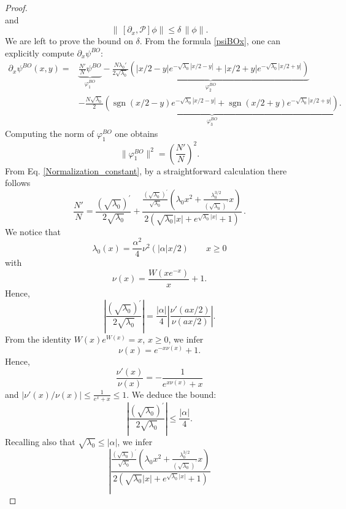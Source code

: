 \documentclass[10pt,a4paper]{amsart}
\newcommand{\NN}{N}
\newcommand{\PP}{\mathcal P}
\DeclareMathOperator{\sgn}{sgn}
\begin{document}
\begin{proof}
\[    \]
    and   
    \[
    \|\,[\partial_x, \PP]\phi\|  
     \leq \delta\, \|\phi\|. 
    \]   
We are left to prove the bound on $\delta$.
    From the formula \eqref{psiBOx}, one can explicitly compute $\partial_x\psi^{BO}$:
\[
\begin{aligned}
\partial_x \psi^{BO}(x,y) =&
\underbrace{\frac{\NN'}{\NN} \psi^{BO}}_{\varphi^{BO}_1}
-
\underbrace{\frac{{\NN}\lambda_0'}{2\sqrt{\lambda_0}}  
\left(|x/2-y|e^{-\sqrt{\lambda_0}|x/2-y|} +|x/2+y|e^{-\sqrt{\lambda_0}|x/2+y|}\right)}_{\varphi^{BO}_2} 
\\
&-\underbrace{\frac{{\NN} \sqrt{\lambda_0}}{2} 
\left(\sgn(x/2-y)e^{-\sqrt{\lambda_0}|x/2-y|} + \sgn(x/2+y)e^{-\sqrt{\lambda_0}|x/2+y|}\right)}_{\varphi^{BO}_3}. 
\end{aligned}
\]
Computing the norm of $\varphi^{BO}_1$ one obtains
\[
\|\varphi^{BO}_1\|^{2} =\left( \frac{\NN'}{\NN}\right)^2.
\]
From Eq. \eqref{Normalization_constant}, by a straightforward calculation there follows 
    \begin{equation*}
            \frac{\NN'}{\NN} = \frac{(\sqrt{\lambda_0})^{\prime}}{2\sqrt{\lambda_0}} + \frac{\frac{(\sqrt{\lambda_0})^{\prime}}{\sqrt{\lambda_0}} \left(\lambda_0 x^2 + \frac{\lambda_0^{3/2}}{(\sqrt{\lambda_0})^{\prime}}x\right)}{2 \left(  \sqrt{\lambda_0}|x|+e^{\sqrt{\lambda_0}|x|}+1\right)} \, .
    \end{equation*}
We notice that 
\[
\lambda_0(x) = \frac{\alpha^2}{4} \nu^2(|\alpha| x/ 2) \qquad x\geq 0
\]
with 
\[
\nu(x) = \frac{W(xe^{-x})}{x}+1.
\]
Hence, 
\begin{equation*}%
    \left\lvert\frac{(\sqrt{\lambda_0})^{\prime}}{2\sqrt{\lambda_0}} \right\rvert = \frac{|\alpha|}{4}  \left|\frac{\nu'(ax/2)}{\nu(ax/2)}\right|.  
\end{equation*}
From the identity $W(x)e^{W(x)} = x$, $x\geq 0$, we infer 
\[
\nu(x) = e^{-x\nu(x)}+1.
\]
Hence, 
\[
\frac{\nu'(x)}{\nu(x)} = - \frac{1}{e^{x\nu(x)}+x}
\]
and $|\nu'(x)/\nu(x)| \leq \frac{1}{e^{x}+x} \leq 1$. We deduce the bound:  
\begin{equation} \label{sqrtlambdaprime}
    \left| \frac{(\sqrt{\lambda_0})^{\prime}}{2\sqrt{\lambda_0}} \right| \leq \frac{|\alpha|}{4}.
\end{equation}
Recalling also that $\sqrt{\lambda_0} \leq |\alpha|$, we infer
    \begin{equation*}%
 \left|\frac{\frac{(\sqrt{\lambda_0})^{\prime}}{\sqrt{\lambda_0}} \left(\lambda_0 x^2 + \frac{\lambda_0^{3/2}}{(\sqrt{\lambda_0})^{\prime}}x\right)}{2 \left(  \sqrt{\lambda_0}|x|+e^{\sqrt{\lambda_0}|x|}+1\right)} 

\end{equation*}
\end{proof}
\end{document}
